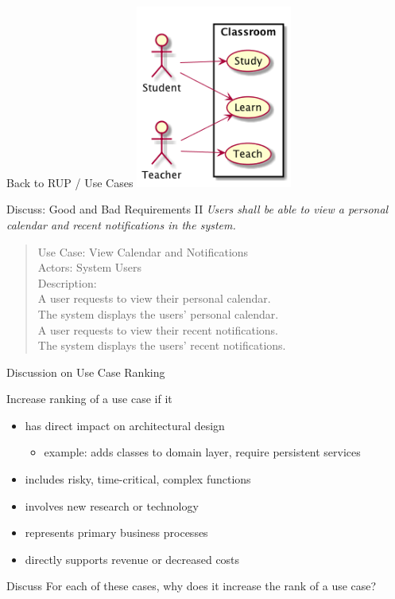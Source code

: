 \documentclass[10pt,t,a4paper]{beamer}
\begin{document}
\begin{frame}[label=sec-1-18]{Back to RUP / Use Cases}
\includegraphics[height=6cm]{FUseCases.png}
\end{frame}

\begin{frame}[label=sec-1-19]{Discuss: Good and Bad Requirements II}
\emph{Users shall be able to view a personal calendar and recent notifications in the system.}

\begin{verse}
Use Case: View Calendar and Notifications \\
Actors: System Users \\
Description: \\
\hspace*{2em}A user requests to view their personal calendar. \\
\hspace*{4em}The system displays the users' personal calendar. \\
\hspace*{2em}A user requests to view their recent notifications. \\
\hspace*{4em}The system displays the users' recent notifications. \\
\end{verse}
\end{frame}
\begin{frame}[label=sec-1-20]{Discussion on Use Case Ranking}
\begin{block}{Increase ranking of a use case if it}
\begin{itemize}
\item has direct impact on architectural design
\begin{itemize}
\item example: adds classes to domain layer, require persistent services
\end{itemize}
\item includes risky, time-critical, complex functions
\item involves new research or technology
\item represents primary business processes
\item directly supports revenue or decreased costs
\end{itemize}
\end{block}
\begin{block}{Discuss}
For each of these cases, why does it increase the rank of a use case?
\end{block}
\end{frame}
\end{document}
